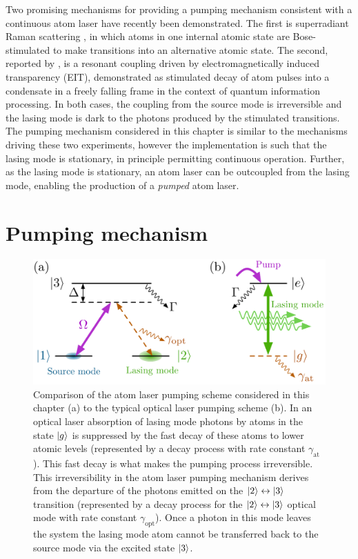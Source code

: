 Two promising mechanisms for providing a pumping mechanism consistent with a continuous atom laser have recently been demonstrated.  The first is superradiant Raman scattering \citep{Schneble:2004,Yoshikawa:2004}, in which atoms in one internal atomic state are Bose-stimulated to make transitions into an alternative atomic state.  The second, reported by \citet{Ginsberg:2007fk}, is a resonant coupling driven by electromagnetically induced transparency (EIT), demonstrated as stimulated decay of atom pulses into a condensate in a freely falling frame in the context of quantum information processing.  In both cases, the coupling from the source mode is irreversible and the lasing mode is dark to the photons produced by the stimulated transitions.  The pumping mechanism considered in this chapter is similar to the mechanisms driving these two experiments, however the implementation is such that the lasing mode is stationary, in principle permitting continuous operation.  Further, as the lasing mode is stationary, an atom laser can be outcoupled from the lasing mode, enabling the production of a \emph{pumped} atom laser.

\section{Pumping mechanism}
\label{OpticalPumping:PumpingMechanism}

\begin{figure}
    \centering
    \includegraphics[width=14cm]{AtomLaserVsOpticalLaser}
    \caption{Comparison of the atom laser pumping scheme considered in this chapter (a) to the typical optical laser pumping scheme (b).  In an optical laser absorption of lasing mode photons by atoms in the state ${\left|g\right>}$ is suppressed by the fast decay of these atoms to lower atomic levels (represented by a decay process with rate constant $\gamma_\text{at}$).  This fast decay is what makes the pumping process irreversible.  This irreversibility in the atom laser pumping mechanism derives from the departure of the photons emitted on the ${\left|2\right>} \leftrightarrow {\ensuremath{\left|3\right>}}$ transition (represented by a decay process for the ${\left|2\right>} \leftrightarrow {\ensuremath{\left|3\right>}}$ optical mode with rate constant $\gamma_\text{opt}$).  Once a photon in this mode leaves the system the lasing mode atom cannot be transferred back to the source mode via the excited state ${\left|3\right>}$.\label{OpticalPumping:AtomLaserVsOpticalLaser}}
\end{figure}


